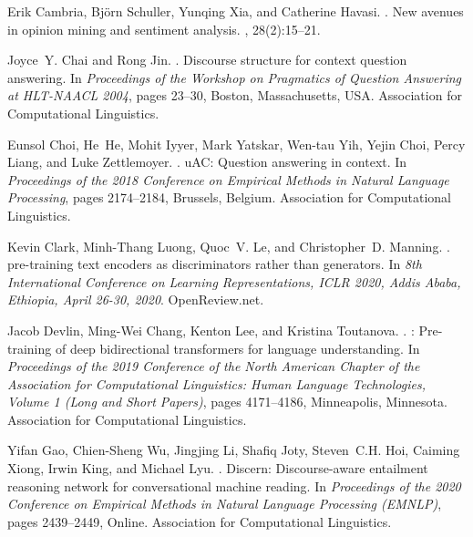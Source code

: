 \documentclass[11pt]{article}
\begin{document}
\begin{thebibliography}{}
Erik Cambria, Bj{\"o}rn Schuller, Yunqing Xia, and Catherine Havasi.
.
\newblock New avenues in opinion mining and sentiment analysis.
, 28(2):15--21.

Joyce~Y. Chai and Rong Jin.
.
\newblock Discourse structure for context question answering.
\newblock In {\em Proceedings of the Workshop on Pragmatics of Question
  Answering at {HLT}-{NAACL} 2004}, pages 23--30, Boston, Massachusetts, USA.
  Association for Computational Linguistics.

Eunsol Choi, He~He, Mohit Iyyer, Mark Yatskar, Wen-tau Yih, Yejin Choi, Percy
  Liang, and Luke Zettlemoyer.
.
u{AC}: Question answering in context.
\newblock In {\em Proceedings of the 2018 Conference on Empirical Methods in
  Natural Language Processing}, pages 2174--2184, Brussels, Belgium.
  Association for Computational Linguistics.

Kevin Clark, Minh{-}Thang Luong, Quoc~V. Le, and Christopher~D. Manning.
.
 pre-training text encoders as discriminators rather than
  generators.
\newblock In {\em 8th International Conference on Learning Representations,
  {ICLR} 2020, Addis Ababa, Ethiopia, April 26-30, 2020}. OpenReview.net.

Jacob Devlin, Ming-Wei Chang, Kenton Lee, and Kristina Toutanova.
.
: Pre-training of deep bidirectional transformers for language
  understanding.
\newblock In {\em Proceedings of the 2019 Conference of the North {A}merican
  Chapter of the Association for Computational Linguistics: Human Language
  Technologies, Volume 1 (Long and Short Papers)}, pages 4171--4186,
  Minneapolis, Minnesota. Association for Computational Linguistics.

Yifan Gao, Chien-Sheng Wu, Jingjing Li, Shafiq Joty, Steven~C.H. Hoi, Caiming
  Xiong, Irwin King, and Michael Lyu.
.
\newblock Discern: Discourse-aware entailment reasoning network for
  conversational machine reading.
\newblock In {\em Proceedings of the 2020 Conference on Empirical Methods in
  Natural Language Processing (EMNLP)}, pages 2439--2449, Online. Association
  for Computational Linguistics.


\end{thebibliography}
\end{document}
